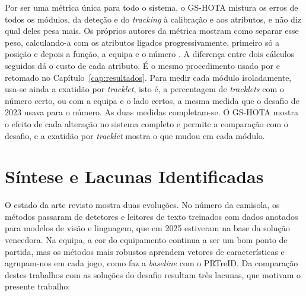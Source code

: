 Por ser uma métrica única para todo o sistema, o GS-HOTA mistura os erros de todos os módulos, da deteção e do \emph{tracking} à calibração e aos atributos, e não diz qual deles pesa mais. Os próprios autores da métrica mostram como separar esse peso, calculando-a com os atributos ligados progressivamente, primeiro só a posição e depois a função, a equipa e o número \citep{somers2024soccernet}. A diferença entre dois cálculos seguidos dá o custo de cada atributo. É o mesmo procedimento usado por \citet{oo2026broadcast2pitch} e retomado no Capítulo~\ref{cap:resultados}. Para medir cada módulo isoladamente, usa-se ainda a exatidão por \emph{tracklet}, isto é, a percentagem de \emph{tracklets} com o número certo, ou com a equipa e o lado certos, a mesma medida que o desafio de 2023 usava para o número. As duas medidas completam-se. O GS-HOTA mostra o efeito de cada alteração no sistema completo e permite a comparação com o desafio, e a exatidão por \emph{tracklet} mostra o que mudou em cada módulo.

\section{Síntese e Lacunas Identificadas}
\label{sec:sintese_lacunas}

O estado da arte revisto mostra duas evoluções. No número da camisola, os métodos passaram de detetores e leitores de texto treinados com dados anotados para modelos de visão e linguagem, que em 2025 estiveram na base da solução vencedora. Na equipa, a cor do equipamento continua a ser um bom ponto de partida, mas os métodos mais robustos aprendem vetores de características e agrupam-nos em cada jogo, como faz a \emph{baseline} com o PRTreID. Da comparação destes trabalhos com as soluções do desafio resultam três lacunas, que motivam o presente trabalho:

